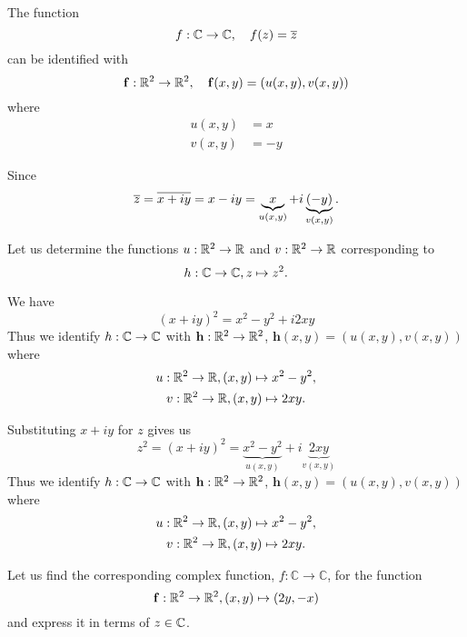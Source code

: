 \begin{example}
The function \[ f: \mathbb{C} \to \mathbb{C},\quad f(z) = \overline{z} \]
can be identified with 
\[ \mathbf{f}: \mathbb{R}^2 \to \mathbb{R}^2, \quad \mathbf{f}(x,y) = \left( u(x,y), v(x,y) \right)
\]
where
\begin{align*}
u(x,y) &= x \\
v(x,y) &= -y
\end{align*}
\end{example}
Since
\[
\overline{z} = \overline{x+iy} = x-iy = \underbrace{x}_{u(x,y)} + i \underbrace{(-y)}_{v(x,y)}.
\]


\begin{example}

Let us determine the functions $u:\mathbb{R}^2 \to \mathbb{R}$ and $v:\mathbb{R}^2 \to \mathbb{R}$ corresponding to
\begin{equation*}
h: \mathbb{C} \to \mathbb{C}, z \mapsto z^2.
\end{equation*}

{ We have
\[
(x+iy)^2 = x^2-y^2+i2xy
\]
Thus we identify $h:\mathbb{C} \to \mathbb{C}$ with $\mathbf{h}:\mathbb{R}^2 \to \mathbb{R}^2$, $\mathbf{h}(x,y) = (u(x,y), v(x,y))$  where
\begin{gather*}
u: \mathbb{R}^2 \to \mathbb{R}, (x,y) \mapsto x^2-y^2, \\
v: \mathbb{R}^2 \to \mathbb{R}, (x,y) \mapsto 2xy.
\end{gather*}
}
\end{example}


Substituting $x + iy$ for $z$ gives us
\begin{equation*}
z^2 = (x+i y)^2 = \underbrace{x^2-y^2}_{u(x,y)} +i\underbrace{ 2xy }_{v(x,y)}
\end{equation*}
Thus we identify $h:\mathbb{C} \to \mathbb{C}$ with $\mathbf{h}:\mathbb{R}^2 \to \mathbb{R}^2$, $\mathbf{h}(x,y) = (u(x,y), v(x,y))$  where
\begin{gather*}
u: \mathbb{R}^2 \to \mathbb{R}, (x,y) \mapsto x^2-y^2, \\
v: \mathbb{R}^2 \to \mathbb{R}, (x,y) \mapsto 2xy.
\end{gather*}


\begin{example} Let us find the corresponding complex function, $f:{\mathbb C} \rightarrow {\mathbb C}$, for the function
\begin{equation*}
\mathbf{f} : \mathbb{R}^2 \to \mathbb{R}^2, (x,y) \mapsto (2y,-x)
\end{equation*}
and express it in terms of $z \in \mathbb{C}$.
\end{example}

